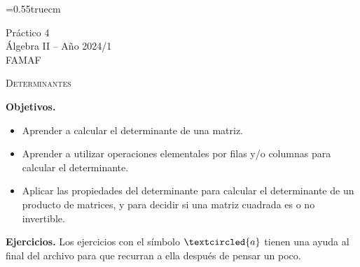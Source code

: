 \documentclass[a4paper,12pt,twoside,spanish,reqno]{amsbook}
\numberwithin{equation}{section}
\begin{document}
    \baselineskip=0.55truecm %
    
    
    {\bf \begin{center} Práctico 4 \\ Álgebra  II -- Año 2024/1 \\ FAMAF \end{center}}



\centerline{\textsc{Determinantes}}


\noindent \textbf{Objetivos.}

\begin{itemize}
\item Aprender a calcular el determinante de una matriz.

\item Aprender a utilizar operaciones elementales por filas y/o columnas para calcular el determinante.

\item Aplicar las propiedades del determinante para calcular el determinante de un producto de matrices, y para decidir si una matriz cuadrada es o no invertible.
\end{itemize}
		

\noindent \textbf{Ejercicios.} Los ejercicios con el símbolo $\textcircled{a}$ tienen una ayuda al final del archivo para que recurran a ella después de pensar un poco.
\end{document}
